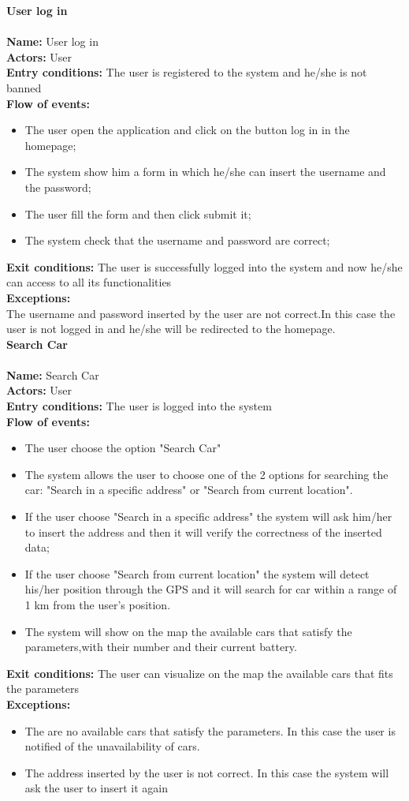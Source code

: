 \textbf{User log in} \\
\\
\textbf{Name:} User log in \\
\textbf{Actors:} User \\
\textbf{Entry conditions:} The user is registered to the system and he/she is not banned\\
\textbf{Flow of events:}
\begin{itemize}
\item The user open the application and click on the button log in in the homepage;
\item The system show him a form in which he/she can insert the username and the password;
\item The user fill the form and then click submit it;
\item The system check that the username and password are correct;
\end{itemize}
\textbf{Exit conditions:} The user is successfully logged into the system and now he/she can access to all its functionalities \\
\textbf{Exceptions:} \\
The username and password inserted by the user are not correct.In this case the user is not logged in and he/she will be redirected to the homepage.\\

\textbf{Search Car}\\
\\
\textbf{Name:} Search Car\\
\textbf{Actors:} User\\
\textbf{Entry conditions:} The user is logged into the system \\
\textbf{Flow of events:}
\begin{itemize}
\item The user choose the option "Search Car"
\item The system allows the user to choose one of the 2 options for searching the car: "Search in a specific address" or "Search from current location".
\item If the user choose "Search in a specific address" the system will ask him/her to insert the address and then it will verify the correctness of the inserted data;
\item If the user choose "Search from current location" the system will detect his/her position through the GPS and it will search for car within a range of 1 km from the user's position.
\item The system will show on the map the available cars that satisfy the parameters,with their number and their current battery.
\end{itemize}
\textbf{Exit conditions:} The user can visualize on the map the available cars that fits the parameters \\
\textbf{Exceptions:}  
\begin{itemize}
\item The are no available cars that satisfy the parameters. In this case the user is notified of the unavailability of cars.
\item The address inserted by the user is not correct. In this case the system will ask the user to insert it again
\end{itemize}